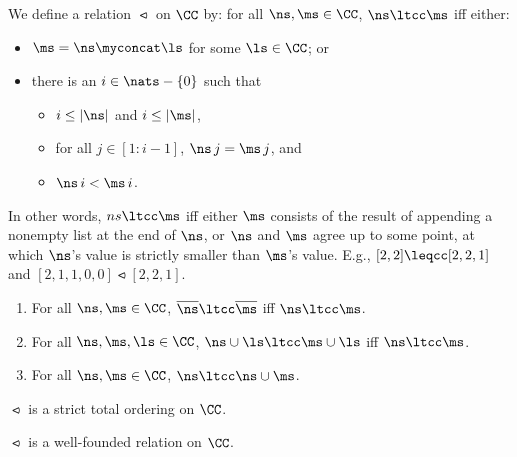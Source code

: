 We define a relation $\ltcc$ on $\CC$ by: for all $\ns,\ms\in\CC$,
$\ns\ltcc\ms$ iff either:
\begin{itemize}
\item $\ms = \ns \myconcat \ls$ for some $\ls\in\CC$; or

\item there is an $i\in\nats - \{0\}$ such that
  \begin{itemize}
  \item $i\leq|\ns|$ and $i\leq|\ms|$,

  \item for all $j\in[1:i-1]$, $\ns\,j = \ms\,j$, and

  \item $\ns\,i < \ms\,i$.
  \end{itemize}
\end{itemize}
In other words, $ns\ltcc\ms$ iff either $\ms$ consists of the
result of appending a nonempty list at the end of $\ns$, or
$\ns$ and $\ms$ agree up to some point, at which $\ns$'s value
is strictly smaller than $\ms$'s value.  E.g.,
$[2, 2]\leqcc[2, 2, 1]$ and $[2,1,1,0,0]\ltcc[2, 2, 1]$.

\begin{proposition}
\label{CCLTContext}
\begin{enumerate}[\quad(1)]
\item For all $\ns,\ms\in\CC$, $\overline{\ns} \ltcc \overline{\ms}$ iff
  $\ns\ltcc\ms$.

\item For all $\ns,\ms,\ls\in\CC$, $\ns\cup\ls \ltcc \ms\cup\ls$ iff
  $\ns \ltcc \ms$.

\item For all $\ns,\ms\in\CC$, $\ns\ltcc\ns\cup\ms$.
\end{enumerate}
\end{proposition}

\begin{proposition}
$\ltcc$ is a strict total ordering on $\CC$.
\end{proposition}

\begin{proposition}
\label{LTCCWellFounded}
$\ltcc$ is a well-founded relation on $\CC$.
\end{proposition}

